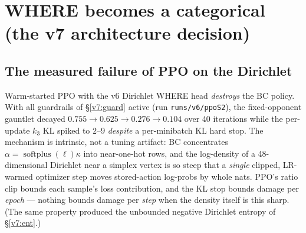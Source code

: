 \documentclass[11pt]{article}
\newcommand{\softplus}{\operatorname{softplus}}
\newcommand{\cd}[1]{\texttt{#1}}
\begin{document}
\section{WHERE becomes a categorical (the v7 architecture decision)}\label{v7:cat}

\subsection{The measured failure of PPO on the Dirichlet}
Warm-started PPO with the v6 Dirichlet WHERE head \emph{destroys} the BC policy. With all
guardrails of \S\ref{v7:guard} active (run \cd{runs/v6/ppoS2}), the fixed-opponent gauntlet decayed
$0.755 \to 0.625 \to 0.276 \to 0.104$ over 40 iterations while the per-update $k_3$ KL spiked to
$2$--$9$ \emph{despite} a per-minibatch KL hard stop. The mechanism is intrinsic, not a tuning
artifact: BC concentrates $\alpha=\softplus(\ell)\kappa$ into near-one-hot rows, and the log-density
of a 48-dimensional Dirichlet near a simplex vertex is so steep that a \emph{single} clipped,
LR-warmed optimizer step moves stored-action log-probs by whole nats. PPO's ratio clip bounds each
sample's loss contribution, and the KL stop bounds damage per \emph{epoch} --- nothing bounds damage
per \emph{step} when the density itself is this sharp. (The same property produced the unbounded
negative Dirichlet entropy of \S\ref{v7:ent}.)
\end{document}
